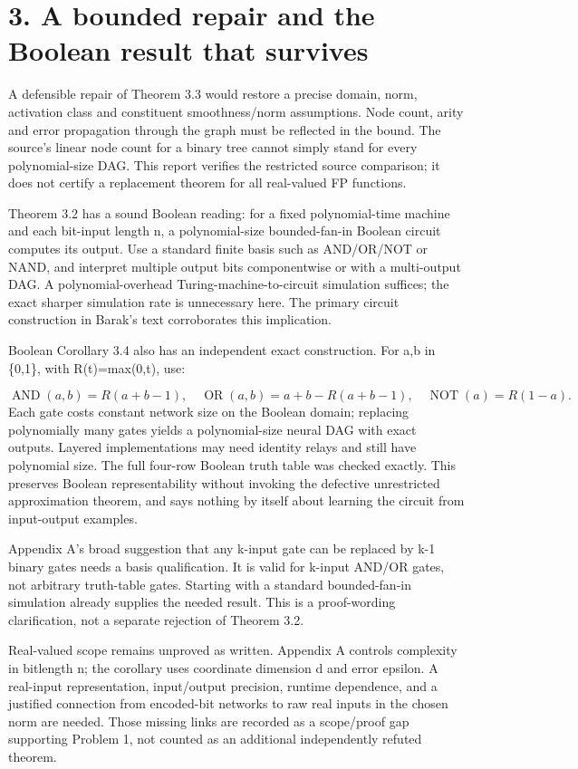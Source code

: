 \documentclass[10pt]{article}
\begin{document}
\section*{3. A bounded repair and the Boolean result that survives}
A defensible repair of Theorem 3.3 would restore a precise domain, norm, activation class and constituent smoothness/norm assumptions. Node count, arity and error propagation through the graph must be reflected in the bound. The source’s linear node count for a binary tree cannot simply stand for every polynomial-size DAG. This report verifies the restricted source comparison; it does not certify a replacement theorem for all real-valued FP functions.\par
Theorem 3.2 has a sound Boolean reading: for a fixed polynomial-time machine and each bit-input length n, a polynomial-size bounded-fan-in Boolean circuit computes its output. Use a standard finite basis such as AND/OR/NOT or NAND, and interpret multiple output bits componentwise or with a multi-output DAG. A polynomial-overhead Turing-machine-to-circuit simulation suffices; the exact sharper simulation rate is unnecessary here. The primary circuit construction in Barak’s text corroborates this implication.\par
Boolean Corollary 3.4 also has an independent exact construction. For a,b in \{0,1\}, with R(t)=max(0,t), use:\par
\[\operatorname{AND}(a,b)=R(a+b-1),\quad
\operatorname{OR}(a,b)=a+b-R(a+b-1),\quad
\operatorname{NOT}(a)=R(1-a).\] Each gate costs constant network size on the Boolean domain; replacing polynomially many gates yields a polynomial-size neural DAG with exact outputs. Layered implementations may need identity relays and still have polynomial size. The full four-row Boolean truth table was checked exactly. This preserves Boolean representability without invoking the defective unrestricted approximation theorem, and says nothing by itself about learning the circuit from input-output examples.\par
Appendix A’s broad suggestion that any k-input gate can be replaced by k-1 binary gates needs a basis qualification. It is valid for k-input AND/OR gates, not arbitrary truth-table gates. Starting with a standard bounded-fan-in simulation already supplies the needed result. This is a proof-wording clarification, not a separate rejection of Theorem 3.2.\par
Real-valued scope remains unproved as written. Appendix A controls complexity in bitlength n; the corollary uses coordinate dimension d and error epsilon. A real-input representation, input/output precision, runtime dependence, and a justified connection from encoded-bit networks to raw real inputs in the chosen norm are needed. Those missing links are recorded as a scope/proof gap supporting Problem 1, not counted as an additional independently refuted theorem.\par
\end{document}

